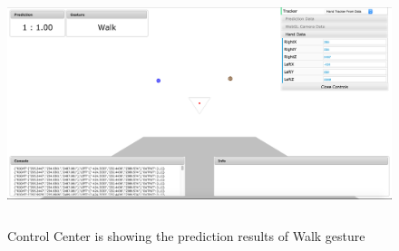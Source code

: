 \begin{figure}
	[h] \centering 
	\includegraphics[height=70mm]{figures/result/cc-walk.jpg} \caption{Control Center is showing the prediction results of Walk gesture} 
	\label{res:cc:walk}
\end{figure}
